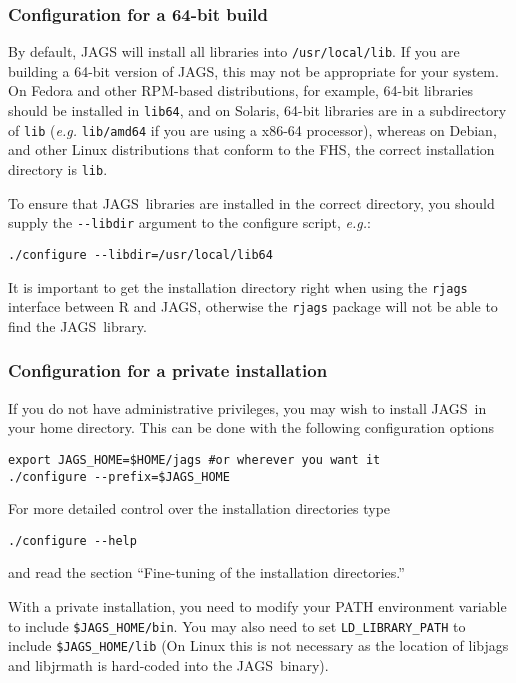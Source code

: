 \documentclass[11pt, a4paper, titlepage]{article}
\newcommand{\JAGS}{\textsf{JAGS}}
\begin{document}
\subsubsection{Configuration for a 64-bit build}

By default, JAGS will install all libraries into
\verb+/usr/local/lib+.  If you are building a 64-bit version of \JAGS,
this may not be appropriate for your system. On Fedora and other
RPM-based distributions, for example, 64-bit libraries should be
installed in \verb+lib64+, and on Solaris, 64-bit libraries are in a
subdirectory of \verb+lib+ ({\em e.g.} \verb+lib/amd64+ if you are
using a x86-64 processor), whereas on Debian, and other Linux
distributions that conform to the FHS, the correct installation
directory is \verb+lib+.

To ensure that \JAGS\ libraries are installed in the correct
directory, you should supply the \verb+--libdir+ argument to the
configure script, {\em e.g.}:
\begin{verbatim}
./configure --libdir=/usr/local/lib64
\end{verbatim}

It is important to get the installation directory right when using the
\texttt{rjags} interface between R and \JAGS, otherwise the
\texttt{rjags} package will not be able to find the \JAGS\ library.

\subsubsection{Configuration for a private installation}

If you do not have administrative privileges, you may wish to install
\JAGS\ in your home directory. This can be done with the following
configuration options
\begin{verbatim}
export JAGS_HOME=$HOME/jags #or wherever you want it
./configure --prefix=$JAGS_HOME
\end{verbatim}
For more detailed control over the installation directories type
\begin{verbatim}
./configure --help
\end{verbatim}
and read the section ``Fine-tuning of the installation directories.''

With a private installation, you need to modify your PATH environment
variable to include \verb+$JAGS_HOME/bin+. You may also need to set
\verb+LD_LIBRARY_PATH+ to include \verb+$JAGS_HOME/lib+ (On Linux this
is not necessary as the location of libjags and libjrmath is hard-coded
into the \JAGS\ binary).
\end{document}
